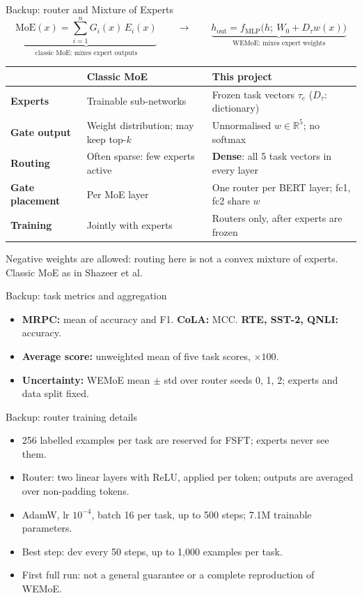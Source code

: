 \documentclass[aspectratio=169,10pt]{beamer}
\begin{document}
\begin{frame}{Backup: router and Mixture of Experts}
  \centering
  \[
    \underbrace{\mathrm{MoE}(x)=\sum_{i=1}^{n}G_i(x)\,E_i(x)}_{\text{classic MoE: mixes expert outputs}}
    \qquad\longrightarrow\qquad
    \underbrace{h_{\text{out}}=f_{\text{MLP}}\big(h;\ W_0+D_{\tau}w(x)\big)}_{\text{WEMoE: mixes expert weights}}
  \]
  \vfill
  \footnotesize
  \begin{tabularx}{\linewidth}{>{\bfseries}p{2.5cm} X X}
    \toprule
    & Classic MoE & This project\\
    \midrule
    Experts & Trainable sub-networks & Frozen task vectors $\tau_e$ ($D_{\tau}$: dictionary)\\
    Gate output & Weight distribution; may keep top-$k$ & Unnormalised $w\in\mathbb{R}^5$; no softmax\\
    Routing & Often sparse: few experts active & \textbf{Dense}: all 5 task vectors in every layer\\
    Gate placement & Per MoE layer & One router per BERT layer; fc1, fc2 share $w$\\
    Training & Jointly with experts & Routers only, after experts are frozen\\
    \bottomrule
  \end{tabularx}
  \vfill
  \raggedright
  Negative weights are allowed: routing here is not a convex mixture of experts. Classic MoE as in Shazeer et al.\cite{shazeer2017moe}
\end{frame}

\begin{frame}{Backup: task metrics and aggregation}
  \begin{itemize}
    \item \textbf{MRPC:} mean of accuracy and F1. \textbf{CoLA:} MCC. \textbf{RTE, SST-2, QNLI:} accuracy.
    \item \textbf{Average score:} unweighted mean of five task scores, $\times 100$.
    \item \textbf{Uncertainty:} WEMoE mean $\pm$ std over router seeds 0, 1, 2; experts and data split fixed.
  \end{itemize}
\end{frame}

\begin{frame}{Backup: router training details}
  \begin{itemize}
    \item 256 labelled examples per task are reserved for FSFT; experts never see them.
    \item Router: two linear layers with ReLU, applied per token; outputs are averaged over non-padding tokens.
    \item AdamW, lr $10^{-4}$, batch 16 per task, up to 500 steps; 7.1M trainable parameters.
    \item Best step: dev every 50 steps, up to 1,000 examples per task.
    \item First full run: not a general guarantee or a complete reproduction of WEMoE.
  \end{itemize}
\end{frame}
\end{document}
